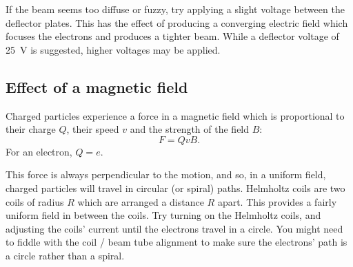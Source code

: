 If the beam seems too diffuse or fuzzy, try applying a slight voltage between the deflector plates.  This has the effect of producing a converging electric field which focuses the electrons and produces a tighter beam.  While a deflector voltage of \SI{25}{V} is suggested, higher voltages may be applied.

\subsection{Effect of a magnetic field}

Charged particles experience a force in a magnetic field which is proportional to their charge $Q$, their speed $v$ and the strength of the field $B$:
\[F=QvB.\]  For an electron, $Q=e$.

This force is always perpendicular to the motion, and so, in a uniform field, charged particles will travel in circular (or spiral) paths. 
%
%
%
%
Helmholtz coils are two coils of radius $R$ which are arranged a distance $R$ apart.  This provides a fairly uniform field in between the coils.  Try turning on the Helmholtz coils, and adjusting the coils' current until the electrons travel in a circle.  You might need to fiddle with the coil / beam tube alignment to make sure the electrons' path is a circle rather than a spiral.

